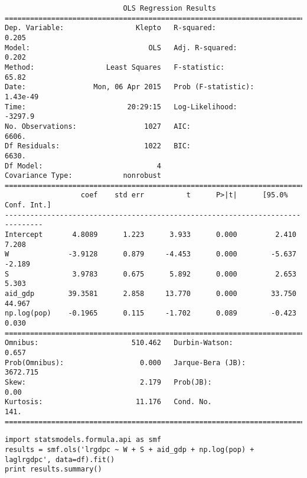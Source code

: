 \documentclass[12pt,fleqn]{article}\usepackage{common}
\begin{document}
\begin{verbatim}
                            OLS Regression Results                            
==============================================================================
Dep. Variable:                 Klepto   R-squared:                       0.205
Model:                            OLS   Adj. R-squared:                  0.202
Method:                 Least Squares   F-statistic:                     65.82
Date:                Mon, 06 Apr 2015   Prob (F-statistic):           1.43e-49
Time:                        20:29:15   Log-Likelihood:                -3297.9
No. Observations:                1027   AIC:                             6606.
Df Residuals:                    1022   BIC:                             6630.
Df Model:                           4                                         
Covariance Type:            nonrobust                                         
===============================================================================
                  coef    std err          t      P>|t|      [95.0% Conf. Int.]
-------------------------------------------------------------------------------
Intercept       4.8089      1.223      3.933      0.000         2.410     7.208
W              -3.9128      0.879     -4.453      0.000        -5.637    -2.189
S               3.9783      0.675      5.892      0.000         2.653     5.303
aid_gdp        39.3581      2.858     13.770      0.000        33.750    44.967
np.log(pop)    -0.1965      0.115     -1.702      0.089        -0.423     0.030
==============================================================================
Omnibus:                      510.462   Durbin-Watson:                   0.657
Prob(Omnibus):                  0.000   Jarque-Bera (JB):             3672.715
Skew:                           2.179   Prob(JB):                         0.00
Kurtosis:                      11.176   Cond. No.                         141.
==============================================================================

\end{verbatim}

\begin{verbatim}
import statsmodels.formula.api as smf
results = smf.ols('lrgdpc ~ W + S + aid_gdp + np.log(pop) + laglrgdpc', data=df).fit()
print results.summary()
\end{verbatim}
\end{document}
